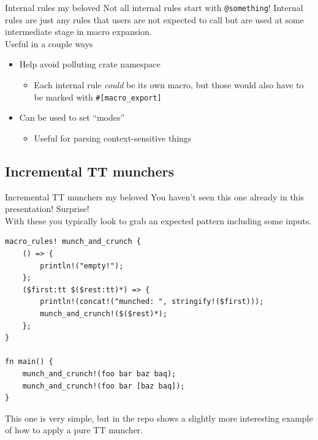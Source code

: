 \documentclass{beamer}
\begin{document}
	\begin{frame}{Internal rules my beloved}
		Not all internal rules start with \texttt{@something}! Internal rules are just any rules
		that users are not expected to call but are used at some intermediate stage in macro
		expansion. \\

		Useful in a couple ways
		\begin{itemize}
			\item Help avoid polluting crate namespace
			\begin{itemize}
				\item Each internal rule \emph{could} be its own macro, but those would also have to
					be marked with \texttt{\#[macro\_export]}
			\end{itemize}

			\item Can be used to set ``modes''
			\begin{itemize}
				\item Useful for parsing context-sensitive things
			\end{itemize}
		\end{itemize}
	\end{frame}

	\subsection{Incremental TT munchers}
	\begin{frame}[fragile]{Incremental TT munchers my beloved}
		You haven't seen this one already in this presentation! Surprise! \\

		With these you typically look to grab an expected pattern including some inputs.

		\begin{verbatim}
macro_rules! munch_and_crunch {
	() => {
		println!("empty!");
	};
	($first:tt $($rest:tt)*) => {
		println!(concat!("munched: ", stringify!($first)));
		munch_and_crunch!($($rest)*);
	};
}

fn main() {
	munch_and_crunch!(foo bar baz baq);
	munch_and_crunch!(foo bar [baz baq]);
}
		\end{verbatim}

		This one is very simple, but  in the repo shows a slightly more interesting
		example of how to apply a pure TT muncher.
	\end{frame}
\end{document}
